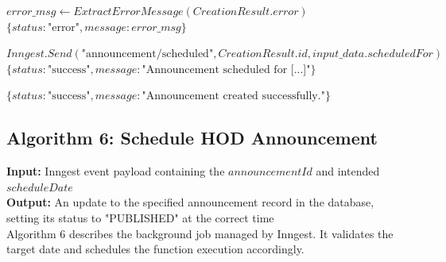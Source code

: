 \begin{algorithm}[H]
\begin{algorithmic}[1]
        \State $error\_msg \gets ExtractErrorMessage(CreationResult.error)$
        \State \Return $\{status: \text{"error"}, message: error\_msg\}$
    \EndIf

    \State {}
        \State $Inngest.Send(\text{"announcement/scheduled"}, CreationResult.id, input\_data.scheduledFor)$
        \State \Return $\{status: \text{"success"}, message: \text{"Announcement scheduled for [...]"}\}$
    \EndIf

    \State \Return $\{status: \text{"success"}, message: \text{"Announcement created successfully."}\}$

\EndFunction

\end{algorithmic}
\end{algorithm}



\subsection{Algorithm 6: Schedule HOD Announcement}

\textbf{Input:} Inngest event payload containing the $announcementId$ and intended $scheduleDate$ \\
\textbf{Output:} An update to the specified announcement record in the database, setting its status to "PUBLISHED" at the correct time \\

Algorithm 6 describes the background job managed by Inngest. It validates the target date and schedules the function execution accordingly.

